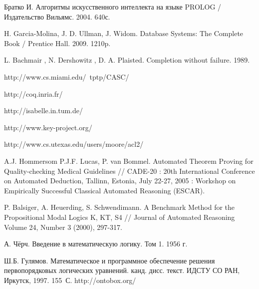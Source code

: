 \begin{thebibliography}{99}
 Братко И. Алгоритмы искусственного интеллекта на языке PROLOG / Издательство Вильямс. 2004. 640с.

 H. Garcia-Molina, J. D. Ullman, J. Widom. Database Systems: The Complete Book / Prentice Hall. 2009. 1210p.

  L. Bachmair , N. Dershowitz , D. A. Plaisted. Completion without failure. 1989.

 http://www.cs.miami.edu/~tptp/CASC/

 http://coq.inria.fr/

 http://isabelle.in.tum.de/


 http://www.key-project.org/

 http://www.cs.utexas.edu/users/moore/acl2/



 A.J. Hommersom P.J.F. Lucas, P. van Bommel. Automated Theorem Proving for Quality-checking Medical Guidelines // CADE-20 : 20th International Conference on Automated Deduction, Tallinn, Estonia, July 22-27, 2005 : Workshop on Empirically Successful Classical Automated Reasoning (ESCAR).

 P. Balsiger, A. Heuerding, S. Schwendimann. A Benchmark Method for the Propositional Modal Logics K, KT, S4 // Journal of Automated Reasoning Volume 24, Number 3 (2000), 297-317.

 А. Чёрч. Введение в математическую логику. Том 1. 1956 г.

 Ш.Б. Гулямов. Математическое и программное обеспечение решения первопорядковых логических уравнений. канд. дисс. текст. ИДСТУ СО РАН, Иркутск, 1997. 155~С.
 http://ontobox.org/

\end{thebibliography}



